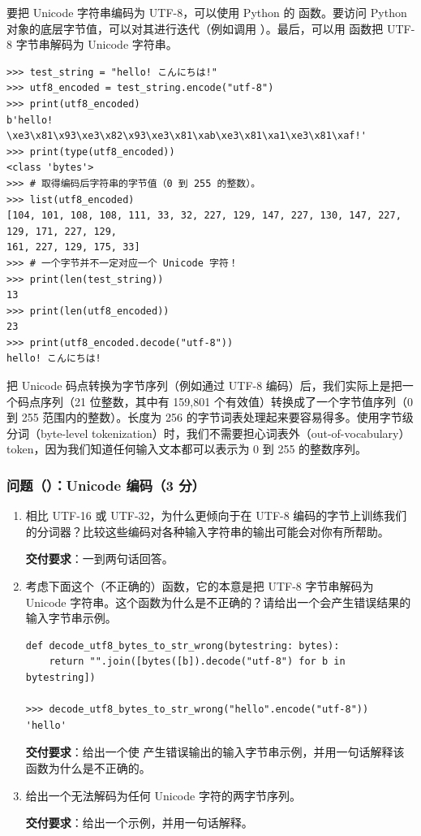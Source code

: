 要把 Unicode 字符串编码为 UTF-8，可以使用 Python 的  函数。要访问 Python  对象的底层字节值，可以对其进行迭代（例如调用 ）。最后，可以用  函数把 UTF-8 字节串解码为 Unicode 字符串。

\begin{lstlisting}
>>> test_string = "hello! こんにちは!"
>>> utf8_encoded = test_string.encode("utf-8")
>>> print(utf8_encoded)
b'hello! \xe3\x81\x93\xe3\x82\x93\xe3\x81\xab\xe3\x81\xa1\xe3\x81\xaf!'
>>> print(type(utf8_encoded))
<class 'bytes'>
>>> # 取得编码后字符串的字节值（0 到 255 的整数）。
>>> list(utf8_encoded)
[104, 101, 108, 108, 111, 33, 32, 227, 129, 147, 227, 130, 147, 227, 129, 171, 227, 129,
161, 227, 129, 175, 33]
>>> # 一个字节并不一定对应一个 Unicode 字符！
>>> print(len(test_string))
13
>>> print(len(utf8_encoded))
23
>>> print(utf8_encoded.decode("utf-8"))
hello! こんにちは!
\end{lstlisting}

把 Unicode 码点转换为字节序列（例如通过 UTF-8 编码）后，我们实际上是把一个码点序列（21 位整数，其中有 159,801 个有效值）转换成了一个字节值序列（0 到 255 范围内的整数）。长度为 256 的字节词表处理起来要容易得多。使用字节级分词（byte-level tokenization）时，我们不需要担心词表外（out-of-vocabulary）token，因为我们知道任何输入文本都可以表示为 0 到 255 的整数序列。

\subsubsection*{问题（）：Unicode 编码（3 分）}

\begin{enumerate}[label=(\alph*)]
  \item 相比 UTF-16 或 UTF-32，为什么更倾向于在 UTF-8 编码的字节上训练我们的分词器？比较这些编码对各种输入字符串的输出可能会对你有所帮助。

        \textbf{交付要求}：一到两句话回答。

  \item 考虑下面这个（不正确的）函数，它的本意是把 UTF-8 字节串解码为 Unicode 字符串。这个函数为什么是不正确的？请给出一个会产生错误结果的输入字节串示例。

\begin{lstlisting}
def decode_utf8_bytes_to_str_wrong(bytestring: bytes):
    return "".join([bytes([b]).decode("utf-8") for b in bytestring])

>>> decode_utf8_bytes_to_str_wrong("hello".encode("utf-8"))
'hello'
\end{lstlisting}

        \textbf{交付要求}：给出一个使  产生错误输出的输入字节串示例，并用一句话解释该函数为什么是不正确的。

  \item 给出一个无法解码为任何 Unicode 字符的两字节序列。

        \textbf{交付要求}：给出一个示例，并用一句话解释。
\end{enumerate}

